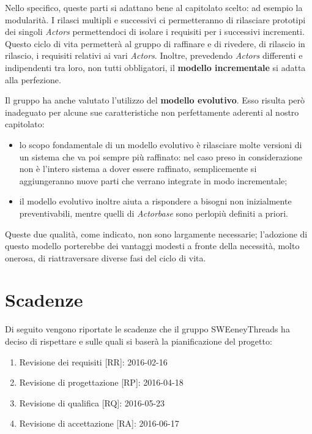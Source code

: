 \documentclass[a4paper]{report}
\begin{document}
			Nello specifico, queste parti si adattano bene al capitolato scelto: ad esempio la modularità. I rilasci 
			multipli e successivi ci permetteranno di rilasciare prototipi dei singoli \emph{Actors} permettendoci di
			isolare i requisiti per i successivi incrementi. Questo ciclo di vita permetterà al gruppo di raffinare e 
			di rivedere, di rilascio in rilascio, i requisiti relativi ai vari \emph{Actors}. Inoltre, prevedendo 
			\emph{Actors} differenti e indipendenti tra loro, non tutti obbligatori, il \textbf{modello incrementale} 
			si adatta alla perfezione.
			
			Il gruppo ha anche valutato l'utilizzo del \textbf{modello evolutivo}. Esso risulta però inadeguato per alcune sue 
			caratteristiche non perfettamente aderenti al nostro capitolato:
			\begin{itemize}
				\item lo scopo fondamentale di un modello evolutivo è rilasciare molte versioni di un sistema che va 
				poi sempre più raffinato: nel caso preso in considerazione non è l'intero sistema a dover essere raffinato, 
				semplicemente si aggiungeranno nuove parti che verrano integrate in modo incrementale;
				\item il modello evolutivo inoltre aiuta a rispondere a bisogni non inizialmente preventivabili, mentre 
				quelli di \emph{Actorbase} sono perlopiù definiti a priori.
			\end{itemize}
			Queste due qualità, come indicato, non sono largamente necessarie; l'adozione di questo modello porterebbe dei 
			vantaggi modesti a fronte della necessità, molto onerosa, di riattraversare diverse fasi del ciclo di vita.
		\section{Scadenze}
			Di seguito vengono riportate le scadenze che il gruppo SWEeneyThreads ha deciso di rispettare e sulle quali 
			si baserà la pianificazione del progetto:
			\begin{enumerate}
				\item Revisione dei requisiti [RR]: 2016-02-16
				\item Revisione di progettazione [RP]: 2016-04-18
				\item Revisione di qualifica [RQ]: 2016-05-23
				\item Revisione di accettazione [RA]: 2016-06-17
			\end{enumerate}
			
\end{document}
